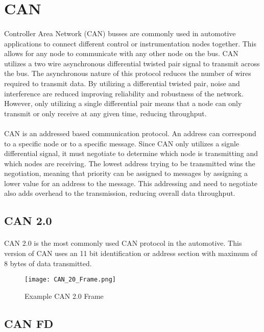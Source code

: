 \section{CAN}

\paragraph{}
Controller Area Network (CAN) busses are commonly used in automotive applications to connect different control or instrumentation nodes together.
This allows for any node to communicate with any other node on the bus.
CAN utilizes a two wire asynchronous differential twisted pair signal to transmit across the bus.
The asynchronous nature of this protocol reduces the number of wires required to transmit data.
By utilizing a differential twisted pair, noise and interference are reduced improving reliability and robustness of the network.
However, only utilizing a single differential pair means that a node can only transmit or only receive at any given time, reducing throughput.

\paragraph{}
CAN is an addressed based communication protocol.
An address can correspond to a specific node or to a specific message.
Since CAN only utilizes a signle differential signal, it must negotiate to determine which node is transmitting and which nodes are receiving.
The lowest address trying to be transmitted wins the negotiation, meaning that priority can be assigned to messages by assigning a lower value for an address to the message.
This addressing and need to negotiate also adds overhead to the transmission, reducing overall data throughput.

\subsection{CAN 2.0}

\paragraph{}
CAN 2.0 is the most commonly used CAN protocol in the automotive.
This version of CAN uses an 11 bit identification or address section with maximum of 8 bytes of data transmitted.

\begin{figure}[H]
	\centering
	\texttt{[image: CAN\_20\_Frame.png]}
	\caption{Example CAN 2.0 Frame}
	\label{fig:CompressionPipeline}
\end{figure}

\subsection{CAN FD}